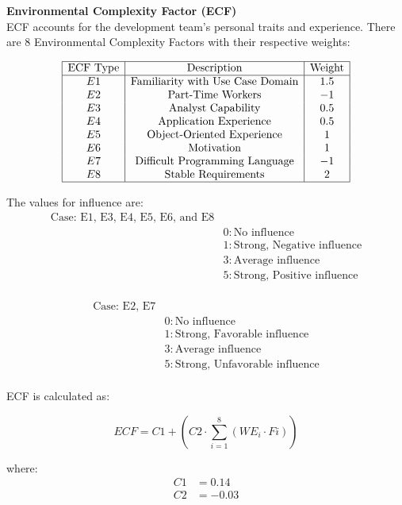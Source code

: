 \documentclass[runningheads]{llncs}
\begin{document}
\textbf{Environmental Complexity Factor (ECF)}\\
ECF accounts for the development team's personal traits and experience. There are 8 Environmental Complexity Factors with their respective weights:

\[
\begin{array}{|c|c|c|}
\hline
\text{ECF Type} & \text{Description} & \text{Weight} \\
\hline
E1 & \text{Familiarity with Use Case Domain} & 1.5 \\
E2 & \text{Part-Time Workers} & -1 \\
E3 & \text{Analyst Capability} & 0.5 \\
E4 & \text{Application Experience} & 0.5 \\
E5 & \text{Object-Oriented Experience} & 1 \\
E6 & \text{Motivation} & 1 \\
E7 & \text{Difficult Programming Language} & -1 \\
E8 & \text{Stable Requirements} & 2 \\
\hline
\end{array}
\]

The values for influence are:
\begin{align*}
    \text{Case: E1, E3, E4, E5, E6, and E8} \\
    &0: \text{No influence} \\
    &1: \text{Strong, Negative influence} \\
    &3: \text{Average influence} \\
    &5: \text{Strong, Positive influence} \\
\end{align*}

\begin{align*}
    \text{Case: E2, E7} \\
    &0: \text{No influence} \\
    &1: \text{Strong, Favorable influence} \\
    &3: \text{Average influence} \\
    &5: \text{Strong, Unfavorable influence} \\
\end{align*}

ECF is calculated as:

\[
ECF = C1 + (C2 \cdot \sum_{i=1}^{8} (WE_i \cdot Fi))
\]

where:
\begin{align*}
    C1 &= 0.14 \\
    C2 &= -0.03 \\
\end{align*}
\end{document}
